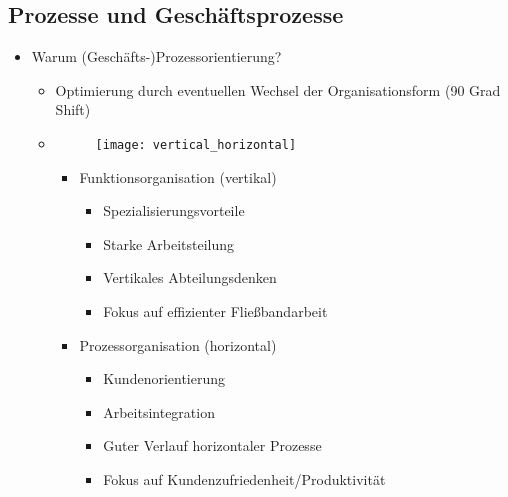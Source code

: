 \subsection{Prozesse und Geschäftsprozesse}
\begin{itemize}

\item Warum (Geschäfts-)Prozessorientierung?
	\begin{itemize}
		\item Optimierung durch eventuellen Wechsel der Organisationsform (90 Grad Shift)	
		\item[] 
		\vspace{0.3cm}
			\begin{minipage}{0.3\textwidth}
				\begin{figure}[H]
				\texttt{[image: vertical\_horizontal]}
				\end{figure}
			\end{minipage}
			\begin{minipage}[t]{0.6\textwidth}
				\vspace{-3cm}
				\begin{itemize}
				\item Funktionsorganisation (vertikal)
					\begin{itemize}
					\item Spezialisierungsvorteile
					\item Starke Arbeitsteilung
					\item Vertikales Abteilungsdenken
					\item Fokus auf effizienter Fließbandarbeit
					\end{itemize}					 
				
				\item Prozessorganisation (horizontal)
					\begin{itemize}
					\item Kundenorientierung 
					\item Arbeitsintegration
					\item Guter Verlauf horizontaler Prozesse
					\item Fokus auf Kundenzufriedenheit/Produktivität
					\end{itemize}
				\end{itemize}
			\end{minipage}
			
	\end{itemize}
	\vspace{0.3cm}


\end{itemize}
